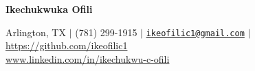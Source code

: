 \newcommand{\mailto}[1]{\href{mailto:#1}{\nolinkurl{#1}}}
\begin{center}
{\huge \textbf{Ikechukwuka Ofili}}
\end{center}    

\begin{center}
Arlington, TX $\vert$ (781) 299-1915 $\vert$ \mailto{ikeofilic1@gmail.com} $\vert$ \url{https://github.com/ikeofilic1}\\
\url{www.linkedin.com/in/ikechukwu-c-ofili}
\end{center}
